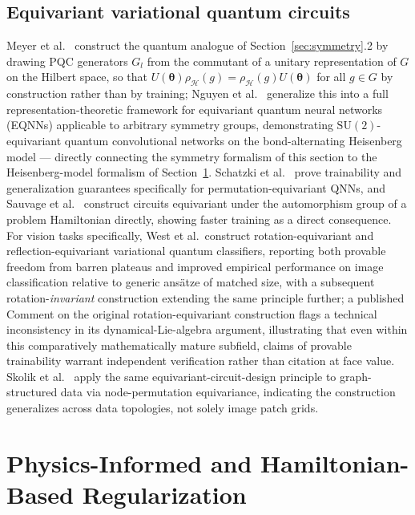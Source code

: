 \documentclass[11pt]{article}
\begin{document}
\subsection{Equivariant variational quantum circuits}
Meyer et al.\ \cite{Meyer2023} construct the quantum analogue of Section~\ref{sec:symmetry}.2 by drawing PQC generators $G_l$ from the commutant of a unitary representation of $G$ on the Hilbert space, so that $U(\bm{\theta})\rho_{\mathcal{H}}(g) = \rho_{\mathcal{H}}(g)U(\bm{\theta})$ for all $g\in G$ by construction rather than by training; Nguyen et al.\ \cite{Nguyen2024EQNN} generalize this into a full representation-theoretic framework for equivariant quantum neural networks (EQNNs) applicable to arbitrary symmetry groups, demonstrating $\mathrm{SU}(2)$-equivariant quantum convolutional networks on the bond-alternating Heisenberg model — directly connecting the symmetry formalism of this section to the Heisenberg-model formalism of Section~\ref{sec:hamiltonian}. Schatzki et al.\ \cite{Schatzki2024} prove trainability and generalization guarantees specifically for permutation-equivariant QNNs, and Sauvage et al.\ \cite{Sauvage2024} construct circuits equivariant under the automorphism group of a problem Hamiltonian directly, showing faster training as a direct consequence. For vision tasks specifically, West et al.\ construct rotation-equivariant \cite{West2024} and reflection-equivariant \cite{West2023} variational quantum classifiers, reporting both provable freedom from barren plateaus and improved empirical performance on image classification relative to generic ansätze of matched size, with a subsequent rotation-\emph{invariant} construction \cite{West2025} extending the same principle further; a published Comment on the original rotation-equivariant construction flags a technical inconsistency in its dynamical-Lie-algebra argument, illustrating that even within this comparatively mathematically mature subfield, claims of provable trainability warrant independent verification rather than citation at face value. Skolik et al.\ \cite{Skolik2023} apply the same equivariant-circuit-design principle to graph-structured data via node-permutation equivariance, indicating the construction generalizes across data topologies, not solely image patch grids.

\section{Physics-Informed and Hamiltonian-Based Regularization}
\label{sec:hamiltonian}
\end{document}
